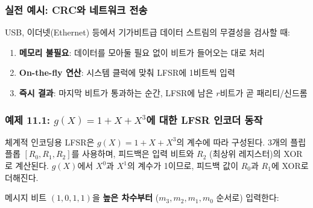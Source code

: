 \documentclass[
  oneside]{article}
\providecommand{\tightlist}{%
  \setlength{\itemsep}{0pt}\setlength{\parskip}{0pt}}
\begin{document}
\subsubsection{실전 예시: CRC와 네트워크
전송}\label{uxc2e4uxc804-uxc608uxc2dc-crcuxc640-uxb124uxd2b8uxc6ccuxd06c-uxc804uxc1a1}

USB, 이더넷(Ethernet) 등에서 기가비트급 데이터 스트림의 무결성을 검사할
때:

\begin{enumerate}
\def\labelenumi{\arabic{enumi}.}
\tightlist
\item
  \textbf{메모리 불필요}: 데이터를 모아둘 필요 없이 비트가 들어오는 대로
  처리
\item
  \textbf{On-the-fly 연산}: 시스템 클럭에 맞춰 LFSR에 1비트씩 입력
\item
  \textbf{즉시 결과}: 마지막 비트가 통과하는 순간, LFSR에 남은
  \(r\)비트가 곧 패리티/신드롬
\end{enumerate}

\subsubsection{\texorpdfstring{예제 11.1: \(g(X) = 1 + X + X^3\)에 대한
LFSR 인코더
동작}{예제 11.1: g(X) = 1 + X + X\^{}3에 대한 LFSR 인코더 동작}}\label{uxc608uxc81c-11.1-gx-1-x-x3uxc5d0-uxb300uxd55c-lfsr-uxc778uxcf54uxb354-uxb3d9uxc791}

체계적 인코딩용 LFSR은 \(g(X) = 1 + X + X^3\)의 계수에 따라 구성된다.
3개의 플립플롭 \([R_0, R_1, R_2]\)를 사용하며, 피드백은 입력 비트와
\(R_2\) (최상위 레지스터)의 XOR로 계산된다. \(g(X)\)에서 \(X^0\)과
\(X^1\)의 계수가 1이므로, 피드백 값이 \(R_0\)과 \(R_1\)에 XOR로
더해진다.

메시지 비트 \((1, 0, 1, 1)\)을 \textbf{높은 차수부터}
(\(m_3, m_2, m_1, m_0\) 순서로) 입력한다:
\end{document}

